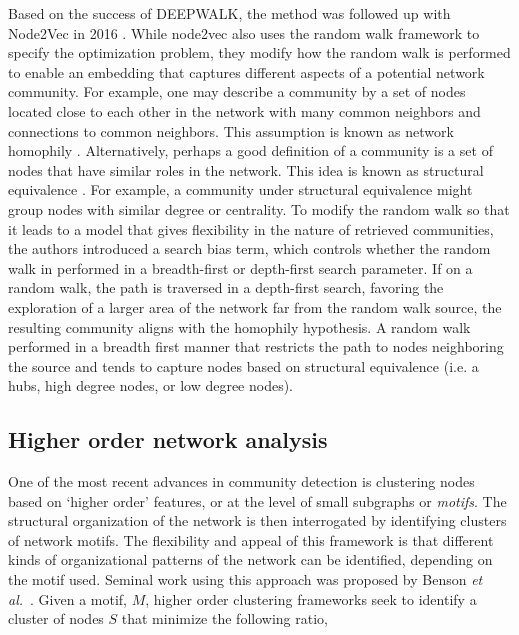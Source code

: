 \indent Based on the success of DEEPWALK, the method was followed up with Node2Vec in 2016 \cite{node2vec}. While node2vec also uses the random walk framework to specify the optimization problem, they modify how the random walk is performed to enable an embedding that captures different aspects of a potential network community. For example, one may describe a community by a set of nodes located close to each other in the network with many common neighbors and connections to common neighbors. This assumption is known as network homophily \cite{homophily}. Alternatively, perhaps a good definition of a community is a set of nodes that have similar roles in the network. This idea is known as structural equivalence \cite{structural}. For example, a community under structural equivalence might group nodes with similar degree or centrality. To modify the random walk so that it leads to a model that gives flexibility in the nature of retrieved communities, the authors introduced a search bias term, which controls whether the random walk in performed in a breadth-first or depth-first search parameter. If on a random walk, the path is traversed in a depth-first search, favoring the exploration of a larger area of the network far from the random walk source, the resulting community aligns with the homophily hypothesis. A random walk performed in a breadth first manner that restricts the path to nodes neighboring the source and tends to capture nodes based on structural equivalence (i.e. a hubs, high degree nodes, or low degree nodes). 

\subsection{Higher order network analysis}
One of the most recent advances in community detection is clustering nodes based on `higher order' features, or at the level of small subgraphs or \emph{motifs}. The structural organization of the network is then interrogated by identifying clusters of network motifs. The flexibility and appeal of this framework is that different kinds of organizational patterns of the network can be identified, depending on the motif used. Seminal work using this approach was proposed by Benson \emph{et al.}~\cite{benson2}. Given a motif, $M$, higher order clustering frameworks seek to identify a cluster of nodes $S$ that minimize the following ratio,

